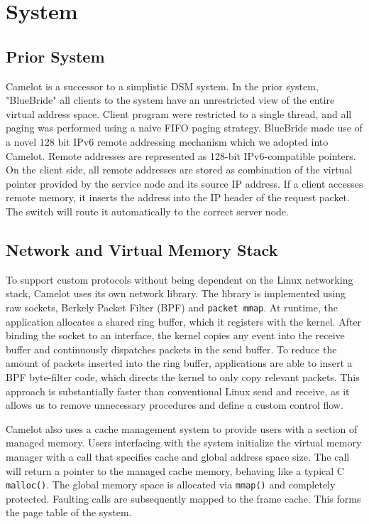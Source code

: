 \section{System}
\label{sec:system}

\subsection{Prior System} Camelot is a successor to a
simplistic DSM system. In the prior system, "BlueBride" all clients to the
system have an unrestricted view of the entire virtual address space.
Client program were restricted to a single thread, and all paging was
performed using a naive FIFO paging strategy. BlueBride made use of a
novel 128 bit IPv6 remote addressing mechanism which we adopted into
Camelot. Remote addresses are represented as 128-bit IPv6-compatible
pointers. On the client side, all remote addresses are stored as
combination of the virtual pointer provided by the service node and
its source IP address. If a client accesses remote memory, it inserts
the address into the IP header of the request packet. The switch will
route it automatically to the correct server node.

\subsection{Network and Virtual Memory Stack}
To support custom protocols without being dependent on the Linux networking stack, Camelot uses its own network library. The library is implemented using raw sockets, Berkely Packet Filter (BPF) and \texttt{packet mmap}.
At runtime, the application allocates a shared ring buffer, which it registers with the kernel.  After binding the socket to an interface, the kernel copies any event into the receive buffer and continuously dispatches packets in the send buffer. To reduce the amount of packets inserted into the ring buffer, applications are able to insert a BPF byte-filter code, which directs the kernel to only copy relevant packets. This approach is substantially faster than conventional Linux send and receive, as it allows us to remove unnecessary procedures and define a custom control flow.

Camelot also uses a cache management system to provide users with a section of managed memory. Users interfacing with the system initialize the virtual memory manager with a call that specifies cache and global address space size. The call will return a pointer to the managed cache memory, behaving like a typical C \texttt{malloc()}. The global memory space is allocated via \texttt{mmap()} and completely protected. Faulting calls are subsequently mapped to the frame cache. This forms the page table of the system. 

